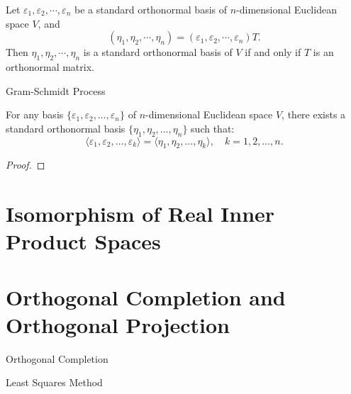 \documentclass[11pt]{../../TexTemplate/elegantbook} %
\begin{document}
\begin{theorem}
    Let \(\varepsilon_{1}, \varepsilon_{2},\cdots, \varepsilon_{n}\) be a standard orthonormal basis of 
    \(n\)-dimensional Euclidean space \( V \), and
    \[
    (\eta_{1}, \eta_{2}, \cdots, \eta_{n}) = (\varepsilon_{1}, \varepsilon_{2}, \cdots, \varepsilon_{n}) T.
    \]
    Then \( \eta_{1}, \eta_{2},\cdots, \eta_{n} \) is a standard orthonormal basis of \( V \)
    if and only if \( T \) is an orthonormal matrix.
\end{theorem}


\begin{leftbarTitle}{Gram-Schmidt Process}\end{leftbarTitle}
\begin{theorem}
    For any basis \( \{ \varepsilon_1, \varepsilon_2, \dots, \varepsilon_n \} \) of \(n\)-dimensional Euclidean space \( V \),
    there exists a standard orthonormal basis \( \{ \eta_1, \eta_2, \dots, \eta_n \} \) such that:
    \[
    \langle \varepsilon_1, \varepsilon_2, \dots, \varepsilon_k \rangle
    = \langle \eta_1, \eta_2, \dots, \eta_k \rangle, \quad k = 1, 2, \dots, n.
    \]
\end{theorem}

\begin{proof}
    
\end{proof}



\section{Isomorphism of Real Inner Product Spaces}

\section{Orthogonal Completion and Orthogonal Projection}
\begin{leftbarTitle}{Orthogonal Completion}\end{leftbarTitle}

\begin{leftbarTitle}{Least Squares Method}\end{leftbarTitle}
\end{document}
